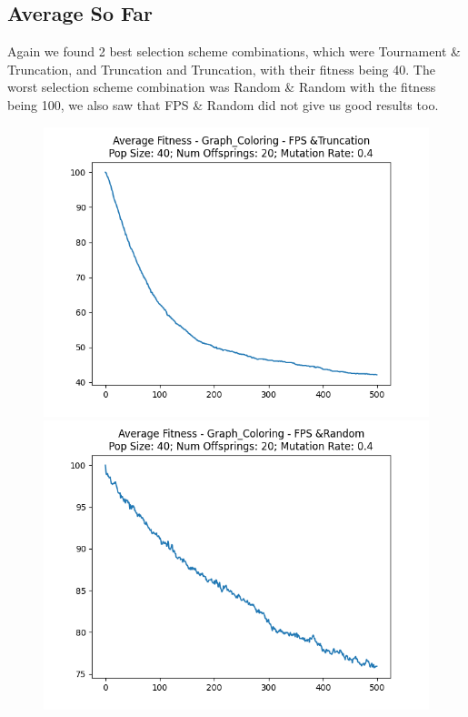 \documentclass[12pt]{report}
\theoremstyle{mytheoremstyle}
\theoremstyle{mytheoremstyle}
\theoremstyle{myproblemstyle}
\begin{document}
\subsection{Average So Far}
Again we found 2 best selection scheme combinations, which were Tournament \& Truncation, and Truncation and Truncation, with their fitness being 40. The worst selection scheme combination was Random \& Random with the fitness being 100, we also saw that FPS \& Random did not give us good results too.

\begin{figure}[!]

	\begin{minipage}{0.4\textwidth}
		\includegraphics[width=\linewidth]{../Analysis/ASF_Graph_Coloring_0_3_40_20.png}
	\end{minipage}
	\hspace{\fill}
	\begin{minipage}{0.4\textwidth}
		\includegraphics[width=\linewidth]{../Analysis/ASF_Graph_Coloring_0_4_40_20.png}

\end{minipage}
\end{figure}
\end{document}
